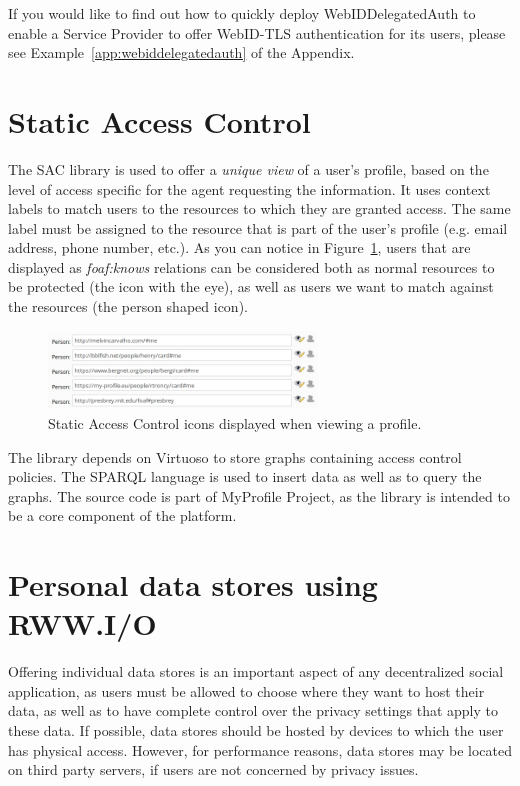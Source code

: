 If you would like to find out how to quickly deploy WebIDDelegatedAuth to enable a Service Provider to offer WebID-TLS authentication for its users, please see Example~\ref{app:webiddelegatedauth} of the Appendix.

\section{Static Access Control}
\label{sec:sac_implem}
The SAC library is used to offer a \textit{unique view} of a user's profile, based on the level of access specific for the agent requesting the information. It uses context labels to match users to the resources to which they are granted access. The same label must be assigned to the resource that is part of the user's profile (e.g. email address, phone number, etc.). As you can notice in Figure~\ref{fig:sac_ui}, users that are displayed as \textit{foaf:knows} relations can be considered both as normal resources to be protected (the icon with the eye), as well as users we want to match against the resources (the person shaped icon).\\

\begin{figure}[h]
  \begin{center}
    \includegraphics[width=270px]{img/screens/sac_ui.jpg}
        \caption{Static Access Control icons displayed when viewing a profile.}
        \label{fig:sac_ui}
  \end{center}
\end{figure}

The library depends on Virtuoso to store graphs containing access control policies. The SPARQL language is used to insert data as well as to query the graphs. The source code is part of MyProfile Project, as the library is intended to be a core component of the platform.

\section{Personal data stores using RWW.I/O}
Offering individual data stores is an important aspect of any decentralized social application, as users must be allowed to choose where they want to host their data, as well as to have complete control over the privacy settings that apply to these data. If possible, data stores should be hosted by devices to which the user has physical access. However, for performance reasons, data stores may be located on third party servers, if users are not concerned by privacy issues.\\

